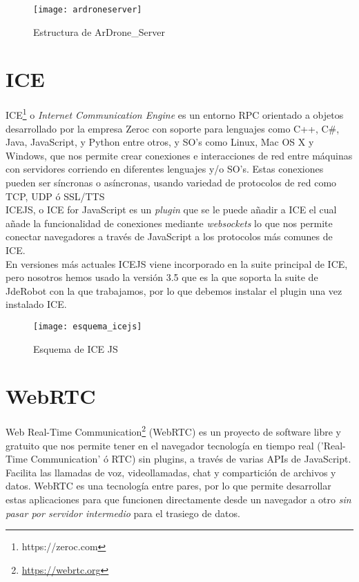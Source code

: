 \begin{figure}[h!]
\centering
\texttt{[image: ardroneserver]}
\caption{Estructura de ArDrone\_Server}
\label{fig:ardroneserver}
\end{figure}

\section{ICE}

ICE\footnote{https://zeroc.com} o \emph{Internet Communication Engine} es un entorno RPC orientado a objetos desarrollado por la empresa Zeroc con soporte para lenguajes como C++, C\#, Java, JavaScript, y Python entre otros, y SO's como Linux, Mac OS X y Windows, que nos permite crear conexiones e interacciones de red entre máquinas con servidores corriendo en diferentes lenguajes y/o SO's. Estas conexiones pueden ser síncronas o asíncronas, usando variedad de protocolos de red como TCP, UDP ó SSL/TTS\\

ICEJS, o ICE for JavaScript es un \textit{plugin} que se le puede añadir a ICE el cual añade la funcionalidad de conexiones mediante \textit{websockets} lo que nos permite conectar navegadores a través de JavaScript a los protocolos más comunes de ICE. \\

En versiones más actuales ICEJS viene incorporado en la suite principal de ICE, pero nosotros hemos usado la versión 3.5 que es la que soporta la suite de JdeRobot con la que trabajamos, por lo que debemos instalar el plugin una vez instalado ICE.\\

\begin{figure}[h!]
\centering
\texttt{[image: esquema\_icejs]}
\caption{Esquema de ICE JS}
\label{fig:esquema_icejs}
\end{figure}

\section{WebRTC}

Web Real-Time Communication\footnote{\url{https://webrtc.org}}\cite{Pagina WebRTC} (WebRTC) es un proyecto de software libre y gratuito que nos permite tener en el navegador tecnología en tiempo real ('Real-Time Communication' ó RTC) sin plugins, a través de varias APIs de JavaScript. Facilita las llamadas de voz, videollamadas, chat y compartición de archivos y datos. WebRTC es una tecnología entre pares, por lo que permite desarrollar estas aplicaciones para que funcionen directamente desde un navegador a otro \emph{sin pasar por servidor intermedio} para el trasiego de datos.\\

